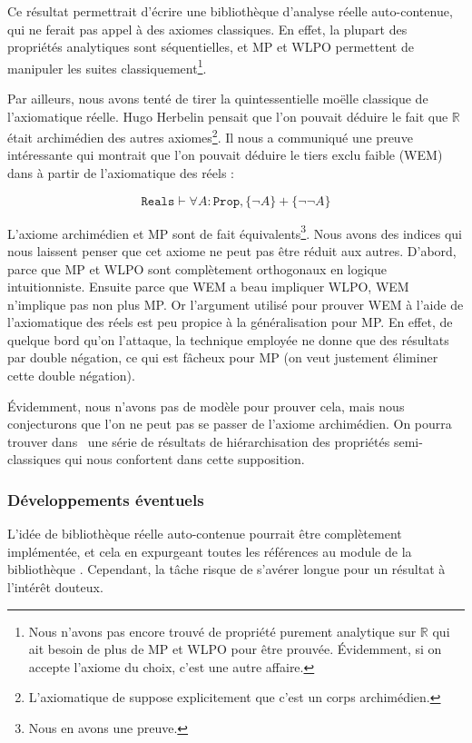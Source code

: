 Ce résultat permettrait d'écrire une bibliothèque d'analyse réelle auto-contenue, qui ne ferait pas appel à des axiomes classiques. En effet, la plupart des propriétés analytiques sont séquentielles, et MP et WLPO permettent de manipuler les suites classiquement\footnote{Nous n'avons pas encore trouvé de propriété purement analytique sur $\mathbb{R}$ qui ait besoin de plus de MP et WLPO pour être prouvée. Évidemment, si on accepte l'axiome du choix, c'est une autre affaire.}.

Par ailleurs, nous avons tenté de tirer la quintessentielle moëlle classique de l'axiomatique réelle. Hugo Herbelin pensait que l'on pouvait déduire le fait que $\mathbb{R}$ était archimédien des autres axiomes\footnote{L'axiomatique de \coq{} suppose explicitement que c'est un corps archimédien.}. Il nous a communiqué une preuve intéressante qui montrait que l'on pouvait déduire le tiers exclu faible (WEM) dans  à partir de l'axiomatique des réels :

$$\mathtt{Reals}\vdash\forall A : \mathtt{Prop}, \{\neg A\} + \{\neg\neg A\}$$

L'axiome archimédien et MP sont de fait équivalents\footnote{Nous en avons une preuve.}. Nous avons des indices qui nous laissent penser que cet axiome ne peut pas être réduit aux autres. D'abord, parce que MP et WLPO sont complètement orthogonaux en logique intuitionniste. Ensuite parce que WEM a beau impliquer WLPO, WEM n'implique pas non plus MP. Or l'argument utilisé pour prouver WEM à l'aide de l'axiomatique des réels est peu propice à la généralisation pour MP. En effet, de quelque bord qu'on l'attaque, la technique employée ne donne que des résultats par double négation, ce qui est fâcheux pour MP (on veut justement éliminer cette double négation).

Évidemment, nous n'avons pas de modèle pour prouver cela, mais nous conjecturons que l'on ne peut pas se passer de l'axiome archimédien. On pourra trouver dans~\cite{LICS04} une série de résultats de hiérarchisation des propriétés semi-classiques qui nous confortent dans cette supposition.

\subsubsection{Développements éventuels}

L'idée de bibliothèque réelle auto-contenue pourrait être complètement implémentée, et cela en expurgeant toutes les références au module  de la bibliothèque . Cependant, la tâche risque de s'avérer longue pour un résultat à l'intérêt douteux.

